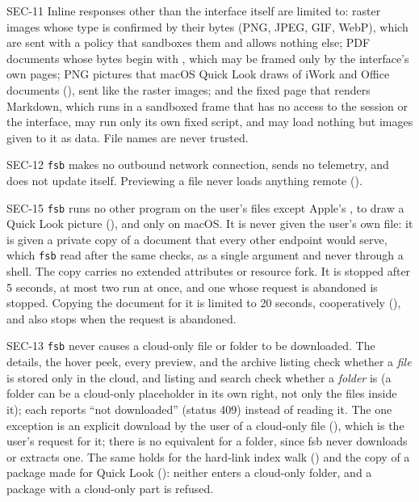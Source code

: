 \begin{req}{SEC-11}
Inline responses other than the interface itself are limited to: raster images
whose type is confirmed by their bytes (PNG, JPEG, GIF, WebP), which are sent with a
policy that sandboxes them and allows nothing else; PDF documents whose bytes begin
with , which may be framed only by the interface's own pages; PNG
pictures that macOS Quick Look draws of iWork and Office documents (),
sent like the raster images; and the
fixed page that renders Markdown, which runs in a sandboxed frame that has no
access to the session or the interface, may run only its own fixed script, and may
load nothing but images given to it as data.  File names are never trusted.
\end{req}

\begin{req}{SEC-12}
\texttt{fsb} makes no outbound network connection, sends no telemetry, and does not
update itself.  Previewing a file never loads anything remote ().
\end{req}

\begin{req}{SEC-15}
\texttt{fsb} runs no other program on the user's files except Apple's
, to draw a Quick Look picture (), and only on macOS.  It is never given
the user's own file: it is given a private copy of a document that every other
endpoint would serve, which \texttt{fsb} read after the same checks, as a single
argument and never through a shell.  The copy carries no extended attributes or
resource fork.  It is stopped after 5 seconds, at most two run at once, and one
whose request is abandoned is stopped.  Copying the document for it is limited to
20 seconds, cooperatively (), and also stops when the request is
abandoned.
\end{req}

\begin{req}{SEC-13}
\texttt{fsb} never causes a cloud-only file or folder to be downloaded.  The details, the
hover peek, every preview, and the archive listing check whether a \emph{file} is stored
only in the cloud, and listing and search check whether a \emph{folder} is (a folder can be
a cloud-only placeholder in its own right, not only the files inside it); each reports
``not downloaded'' (status 409) instead of reading it.  The one exception is an explicit
download by the user of a cloud-only file (), which is the user's request for
it; there is no equivalent for a folder, since fsb never downloads or extracts one.
The same holds for the hard-link index walk () and the copy of a package
made for Quick Look (): neither enters a cloud-only folder, and a package
with a cloud-only part is refused.
\end{req}

